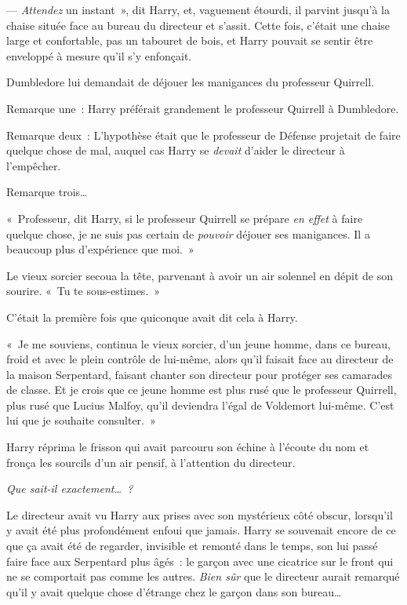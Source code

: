 --- \emph{Attendez} un instant~», dit Harry, et, vaguement étourdi, il parvint jusqu'à la chaise située face au bureau du directeur et s'assit.
Cette fois, c'était une chaise large et confortable, pas un tabouret de bois, et Harry pouvait se sentir être enveloppé à mesure qu'il s'y enfonçait.

Dumbledore lui demandait de déjouer les manigances du professeur Quirrell.

Remarque une~: Harry préférait grandement le professeur Quirrell à Dumbledore.

Remarque deux~: L'hypothèse était que le professeur de Défense projetait de faire quelque chose de mal, auquel cas Harry se \emph{devait} d'aider le directeur à l'empêcher.

Remarque trois…

«~Professeur, dit Harry, si le professeur Quirrell se prépare \emph{en effet} à faire quelque chose, je ne suis pas certain de \emph{pouvoir} déjouer ses manigances.
Il a beaucoup plus d'expérience que moi.~»

Le vieux sorcier secoua la tête, parvenant à avoir un air solennel en dépit de son sourire.
«~Tu te sous-estimes.~»

C'était la première fois que quiconque avait dit cela à Harry.

«~Je me souviens, continua le vieux sorcier, d'un jeune homme, dans ce bureau, froid et avec le plein contrôle de lui-même, alors qu'il faisait face au directeur de la maison Serpentard, faisant chanter son directeur pour protéger ses camarades de classe.
Et je crois que ce jeune homme est plus rusé que le professeur Quirrell, plus rusé que Lucius Malfoy, qu'il deviendra l'égal de Voldemort lui-même.
C'est lui que je souhaite consulter.~»

Harry réprima le frisson qui avait parcouru son échine à l'écoute du nom et fronça les sourcils d'un air pensif, à l'attention du directeur.

\emph{Que sait-il exactement…~?}

Le directeur avait vu Harry aux prises avec son mystérieux côté obscur, lorsqu'il y avait été plus profondément enfoui que jamais.
Harry se souvenait encore de ce que ça avait été de regarder, invisible et remonté dans le temps, son lui passé faire face aux Serpentard plus âgés~: le garçon avec une cicatrice sur le front qui ne se comportait pas comme les autres.
\emph{Bien sûr} que le directeur aurait remarqué qu'il y avait quelque chose d'étrange chez le garçon dans son bureau…


